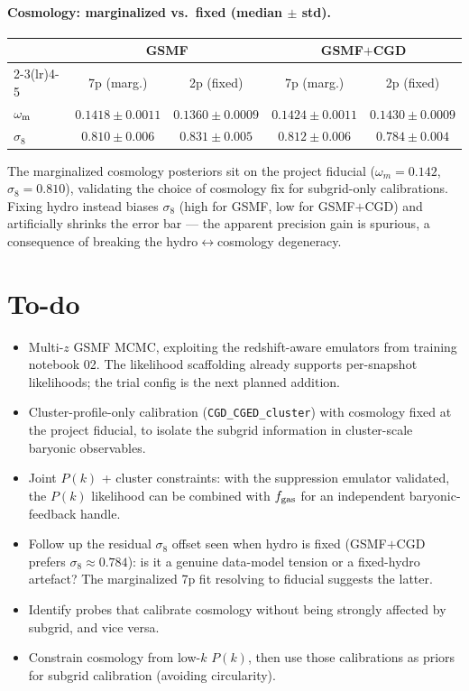 \documentclass{article}
\begin{document}
\paragraph{Cosmology: marginalized vs.\ fixed (median $\pm$ std).}

\begin{center}
\begin{tabular}{lcccc}
\toprule
 & \multicolumn{2}{c}{GSMF} & \multicolumn{2}{c}{GSMF$+$CGD} \\
\cmidrule(lr){2-3}\cmidrule(lr){4-5}
 & 7p (marg.) & 2p (fixed) & 7p (marg.) & 2p (fixed) \\
\midrule
$\omega_{\rm m}$ & $0.1418\pm0.0011$ & $0.1360\pm0.0009$ & $0.1424\pm0.0011$ & $0.1430\pm0.0009$ \\
$\sigma_8$       & $0.810\pm0.006$   & $0.831\pm0.005$   & $0.812\pm0.006$   & $0.784\pm0.004$ \\
\bottomrule
\end{tabular}
\end{center}

The marginalized cosmology posteriors sit on the project fiducial
($\omega_m\!=\!0.142$, $\sigma_8\!=\!0.810$), validating the choice of cosmology
fix for subgrid-only calibrations. Fixing hydro instead biases $\sigma_8$ (high
for GSMF, low for GSMF$+$CGD) and artificially shrinks the error bar --- the
apparent precision gain is spurious, a consequence of breaking the
hydro$\leftrightarrow$cosmology degeneracy.

\FloatBarrier

\section{To-do}

\begin{itemize}
  \item Multi-$z$ GSMF MCMC, exploiting the redshift-aware emulators
        from training notebook 02. The likelihood scaffolding already
        supports per-snapshot likelihoods; the trial config is the
        next planned addition.
  \item Cluster-profile-only calibration
        (\texttt{CGD\_CGED\_cluster}) with cosmology fixed at the
        project fiducial, to isolate the subgrid information in
        cluster-scale baryonic observables.
  \item Joint $P(k)$ + cluster constraints: with the suppression
        emulator validated, the $P(k)$ likelihood can be combined with
        $f_{\rm gas}$ for an independent baryonic-feedback handle.
  \item Follow up the residual $\sigma_8$ offset seen when hydro is fixed
        (GSMF$+$CGD prefers $\sigma_8\!\approx\!0.784$): is it a genuine
        data-model tension or a fixed-hydro artefact? The marginalized 7p
        fit resolving to fiducial suggests the latter.
  \item Identify probes that calibrate cosmology without being strongly
        affected by subgrid, and vice versa.
  \item Constrain cosmology from low-$k$ $P(k)$, then use those calibrations
        as priors for subgrid calibration (avoiding circularity).
\end{itemize}
\end{document}
